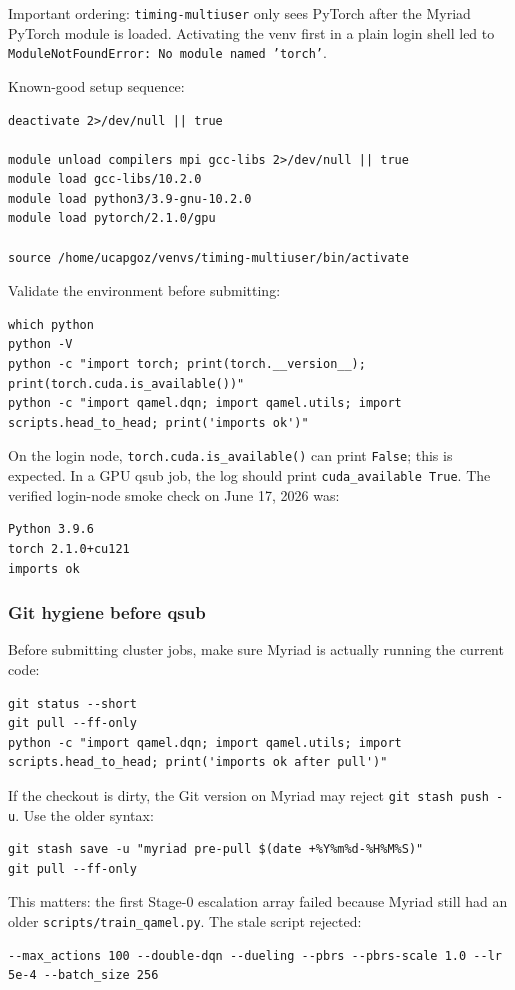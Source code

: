 \documentclass[11pt]{article}
\newcommand{\code}[1]{\texttt{#1}}
\newcommand{\file}[1]{\texttt{\small #1}}
\begin{document}
Important ordering: \code{timing-multiuser} only sees PyTorch after the Myriad
PyTorch module is loaded. Activating the venv first in a plain login shell led to
\code{ModuleNotFoundError: No module named 'torch'}.

Known-good setup sequence:
\begin{verbatim}
deactivate 2>/dev/null || true

module unload compilers mpi gcc-libs 2>/dev/null || true
module load gcc-libs/10.2.0
module load python3/3.9-gnu-10.2.0
module load pytorch/2.1.0/gpu

source /home/ucapgoz/venvs/timing-multiuser/bin/activate
\end{verbatim}

Validate the environment before submitting:
\begin{verbatim}
which python
python -V
python -c "import torch; print(torch.__version__); print(torch.cuda.is_available())"
python -c "import qamel.dqn; import qamel.utils; import scripts.head_to_head; print('imports ok')"
\end{verbatim}

On the login node, \code{torch.cuda.is\_available()} can print \code{False};
this is expected. In a GPU qsub job, the log should print
\code{cuda\_available True}. The verified login-node smoke check on June 17,
2026 was:
\begin{verbatim}
Python 3.9.6
torch 2.1.0+cu121
imports ok
\end{verbatim}

\subsubsection*{Git hygiene before qsub}
Before submitting cluster jobs, make sure Myriad is actually running the current
code:
\begin{verbatim}
git status --short
git pull --ff-only
python -c "import qamel.dqn; import qamel.utils; import scripts.head_to_head; print('imports ok after pull')"
\end{verbatim}

If the checkout is dirty, the Git version on Myriad may reject
\code{git stash push -u}. Use the older syntax:
\begin{verbatim}
git stash save -u "myriad pre-pull $(date +%Y%m%d-%H%M%S)"
git pull --ff-only
\end{verbatim}

This matters: the first Stage-0 escalation array failed because Myriad still had
an older \file{scripts/train\_qamel.py}. The stale script rejected:
\begin{verbatim}
--max_actions 100 --double-dqn --dueling --pbrs --pbrs-scale 1.0 --lr 5e-4 --batch_size 256
\end{verbatim}
\end{document}
